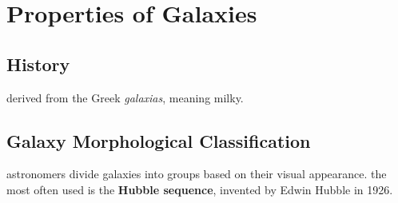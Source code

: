 \section{Properties of Galaxies}
\subsection{History}
derived from the Greek \emph{galaxias}, meaning milky.
\subsection{Galaxy Morphological Classification}
astronomers divide galaxies into groups based on their visual appearance. the most often used is the \textbf{Hubble sequence}, invented by Edwin Hubble in 1926. 



		
